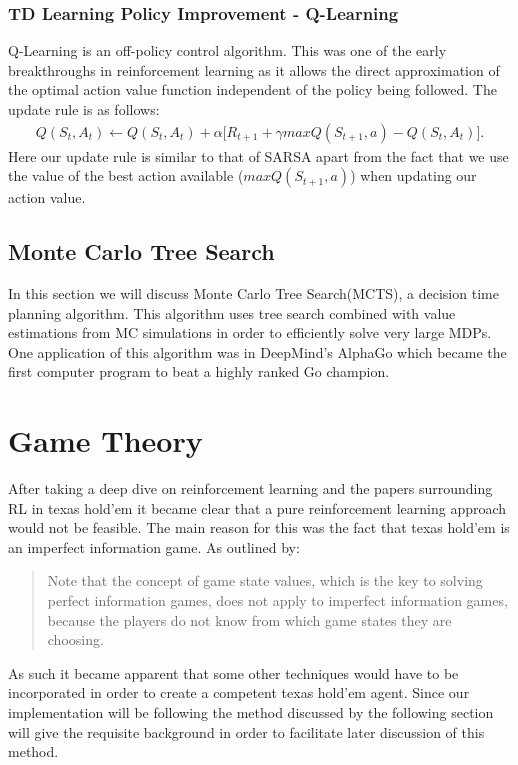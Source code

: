 \subsubsection{TD Learning Policy Improvement - Q-Learning}
Q-Learning is an off-policy control algorithm.
This was one of the early breakthroughs in reinforcement learning as it allows the direct approximation of
the optimal action value function independent of the policy being followed.
The update rule is as follows:
\begin{align}
    Q(S_t, A_t) \leftarrow Q(S_t, A_t) + \alpha \lbrack R_{t+1} + \gamma maxQ(S_{t+1}, a) - Q(S_t, A_t) \rbrack.
\end{align}
Here our update rule is similar to that of SARSA apart from the fact that we use the value of the best
action available ($maxQ(S_{t+1}, a)$) when updating our action value.

\subsection{Monte Carlo Tree Search}\label{subsec:mcts}
In this section we will discuss Monte Carlo Tree Search(MCTS), a decision time planning algorithm.
This algorithm uses tree search combined with value estimations from MC simulations in order to
efficiently solve very large MDPs.
One application of this algorithm was in DeepMind's AlphaGo which became the first computer
program to beat a highly ranked Go champion\citep{silver2016mastering}.



\section{Game Theory}\label{sec:gameTheory}
After taking a deep dive on reinforcement learning and the papers surrounding RL in texas hold'em it became
clear that a pure reinforcement learning approach would not be feasible.
The main reason for this was the fact that texas hold'em is an imperfect information game.
As outlined by\citep{dahl2001reinforcement}:
\begin{quotation}
Note that the concept of game state values, which is the key to solving perfect information games,
does not apply to imperfect information games, because the players do not know from  which game states they
are choosing.
\end{quotation}
As such it became apparent that some other techniques would have to be incorporated in order to create a competent
texas hold'em agent.
Since our implementation will be following the method discussed by\citep{heinrich2017reinforcement}
the following section will give the requisite background in order to facilitate later discussion of this method.

